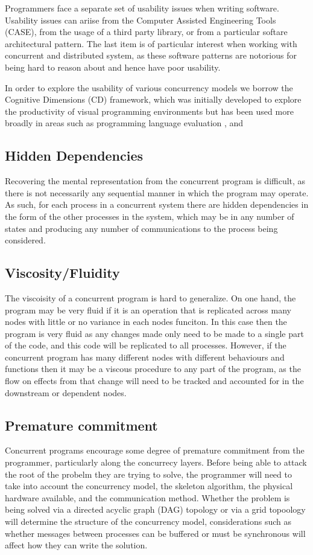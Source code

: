 \documentclass{sig-alternate}
\begin{document}
Programmers face a separate set of usability issues when writing software. Usability issues can ariise from the Computer Assisted Engineering Tools (CASE), from the usage of a third party library, or from a particular softare architectural pattern. The last item is of particular interest when working with concurrent and distributed system, as these software patterns are notorious for being hard to reason about and hence have poor usability.

In order to explore the usability of various concurrency models we borrow the Cognitive Dimensions \cite{green89:_cognit_dimen_notat} (CD) framework, which was initially developed to explore the productivity of visual programming environments but has been used more broadly in areas such as programming language evaluation \cite{enpl}, and 

\subsection{Hidden Dependencies}

Recovering the mental representation from the concurrent program is difficult, as there is not necessarily any sequential manner in which the program may operate. As such, for each process in a concurrent system there are hidden dependencies in the form of the other processes in the system, which may be in any number of states and producing any number of communications to the process being considered.

\subsection{Viscosity/Fluidity}
The viscoisity of a concurrent program is hard to generalize. On one hand, the program may be very fluid if it is an operation that is replicated across many nodes with little or no variance in each nodes funciton. In this case then the program is very fluid as any changes made only need to be made to a single part of the code, and this code will be replicated to all processes. However, if the concurrent program has many different nodes with different behaviours and functions then it may be a viscous procedure to any part of the program, as the flow on effects from that change will need to be tracked and accounted for in the downstream or dependent nodes.

\subsection{Premature commitment}
Concurrent programs encourage some degree of premature commitment from the programmer, particularly along the concurrecy layers. Before being able to attack the root of the probelm they are trying to solve, the programmer will need to take into account the concurrency model, the skeleton algorithm, the physical hardware available, and the communication method. Whether the problem is being solved via a directed acyclic graph (DAG) topology or via a grid topoology will determine the structure of the concurrency model, considerations such as whether messages between processes can be buffered or must be synchronous will affect how they can write the solution.
\end{document}
